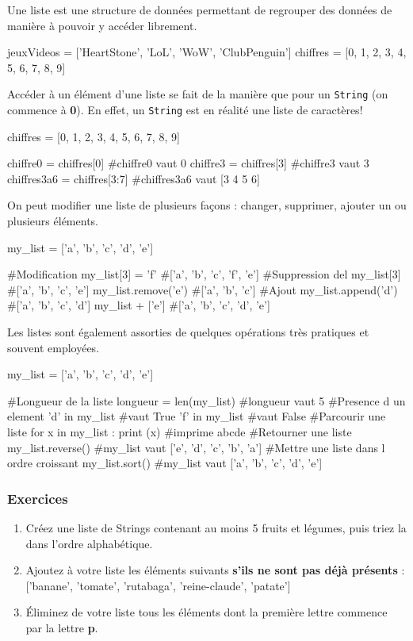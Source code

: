 Une liste est une structure de données permettant de regrouper des données de manière à pouvoir y accéder librement.

\begin{python}[caption = Exemples de listes]
jeuxVideos = ['HeartStone', 'LoL', 'WoW', 'ClubPenguin']
chiffres = [0, 1, 2, 3, 4, 5, 6, 7, 8, 9]
\end{python}

Accéder à un élément d'une liste se fait de la manière que pour un \texttt{String} (on commence à \textbf{0}).
En effet, un \texttt{String} est en réalité une liste de caractères!

\begin{python}[caption = Accès à une liste]
chiffres = [0, 1, 2, 3, 4, 5, 6, 7, 8, 9]

chiffre0 = chiffres[0]      #chiffre0 vaut 0
chiffre3 = chiffres[3]      #chiffre3 vaut 3
chiffres3a6 = chiffres[3:7] #chiffres3a6 vaut [3 4 5 6]
\end{python}

On peut modifier une liste de plusieurs façons : changer, supprimer, ajouter un ou plusieurs éléments.

\begin{python}[caption = Modification de liste]
my_list = ['a', 'b', 'c', 'd', 'e']

#Modification
my_list[3] = 'f'    #['a', 'b', 'c', 'f', 'e']
#Suppression
del my_list[3]      #['a', 'b', 'c', 'e']
my_list.remove('e') #['a', 'b', 'c']
#Ajout
my_list.append('d') #['a', 'b', 'c', 'd']
my_list + ['e']     #['a', 'b', 'c', 'd', 'e']
\end{python}

Les listes sont également assorties de quelques opérations très pratiques et souvent employées.

\begin{python}[caption = Opérations sur les listes]
my_list = ['a', 'b', 'c', 'd', 'e']

#Longueur de la liste
longueur = len(my_list)  #longueur vaut 5
#Presence d un element
'd' in my_list #vaut True 
'f' in my_list #vaut False
#Parcourir une liste
for x in my_list : print (x) #imprime abcde
#Retourner une liste
my_list.reverse() #my_list vaut ['e', 'd', 'c', 'b', 'a']
#Mettre une liste dans l ordre croissant
my_list.sort() #my_list vaut ['a', 'b', 'c', 'd', 'e']
\end{python}

\subsubsection{Exercices}
    \begin{enumerate}
	\item
		Créez une liste de Strings contenant au moins 5 fruits et légumes, puis triez la dans l'ordre alphabétique.
	\item
		Ajoutez à votre liste les éléments suivants \textbf{s'ils ne sont pas déjà présents} :
		['banane', 'tomate', 'rutabaga', 'reine-claude', 'patate']
\item
		Éliminez de votre liste tous les éléments dont la première lettre commence par la lettre \textbf{p}.
\end{enumerate}